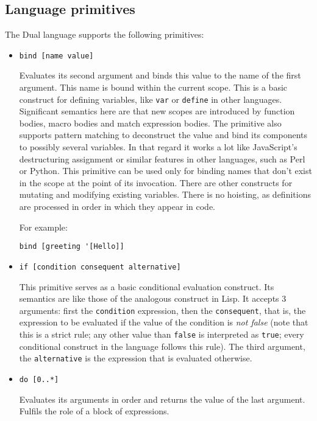 \subsection{Language primitives}\label{sub:primitives}
The Dual language supports the following primitives:
\begin{itemize}
    \item \texttt{bind [name value]}
    
    Evaluates its second argument and binds this value to the name of the first
    argument. This name is bound within the current scope. This is a basic
    construct for defining variables, like \texttt{var} or \texttt{define} in
    other languages. Significant semantics here are that new scopes are
    introduced by function bodies, macro bodies and match expression bodies. The
    primitive also supports pattern matching to deconstruct the value and bind
    its components to possibly several variables. In that regard it works a lot
    like JavaScript's destructuring
    assignment\cite{mdn_destructuring}
    or similar features in other languages, such as Perl or Python. This
    primitive can be used only for binding names that don't exist in the scope
    at the point of its invocation. There are other constructs for mutating and
    modifying existing variables. There is no
    hoisting\cite[Section~var hoisting]{mdn_var},
    as definitions are processed in order in which they appear in code.
    
    For example:
\begin{lstlisting}
bind [greeting '[Hello]]
\end{lstlisting}
    
    \item \texttt{if [condition consequent alternative]}
    
    This primitive serves as a basic conditional evaluation construct. Its
    semantics are like those of the analogous construct in Lisp. It accepts 3
    arguments: first the \texttt{condition} expression, then the
    \texttt{consequent}, that is, the expression to be evaluated if the value of
    the condition is \textit{not false} (note that this is a strict rule; any
    other value than \texttt{false} is interpreted as \texttt{true}; every
    conditional construct in the language follows this rule). The third
    argument, the \texttt{alternative} is the expression that is evaluated
    otherwise.
    \item \texttt{do [0..*]}
        
    Evaluates its arguments in order and returns the value of the last argument. Fulfils the role of a block of expressions.
    

\end{itemize}
